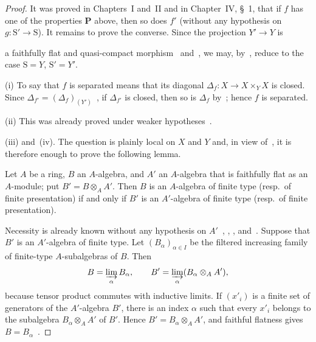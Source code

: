 \begin{proof}
It was proved in Chapters~I and~II and in Chapter~IV, \S~1, that if
$f$ has one of the properties $\mathbf{P}$ above, then so does $f'$
\textnormal{(}without any hypothesis on $g:\mathrm{S}'\to\mathrm{S}$\textnormal{)}.
It remains to prove the converse. Since the projection $Y'\to Y$ is


a faithfully flat and quasi-compact morphism~
and~, we may, by~, reduce to the
case $\mathrm{S}=Y$, $\mathrm{S}'=Y'$.

\textnormal{(i)} To say that $f$ is separated means that its diagonal
$\Delta_f:X\to X\times_Y X$ is closed. Since
$\Delta_{f'}=(\Delta_f)_{(Y')}$~, if
$\Delta_{f'}$ is closed, then so is $\Delta_f$ by~;
hence $f$ is separated.

\textnormal{(ii)} This was already proved under weaker
hypotheses~.

\textnormal{(iii)} and~\textnormal{(iv)}. The question is plainly local
on $X$ and $Y$ and, in view of~, it is therefore enough
to prove the following lemma.

\begin{lemma}[2.7.1.1]
\label{IV.2.7.1.1}
Let $A$ be a ring, $B$ an $A$-algebra, and $A'$ an $A$-algebra that
is faithfully flat as an $A$-module; put $B'=B\otimes_A A'$. Then $B$
is an $A$-algebra of finite type \textnormal{(}resp.\ of finite
presentation\textnormal{)} if and only if $B'$ is an $A'$-algebra of
finite type \textnormal{(}resp.\ of finite presentation\textnormal{)}.
\end{lemma}

Necessity is already known without any hypothesis on
$A'$~, , ,
and~. Suppose that $B'$ is an $A'$-algebra of finite
type. Let $(B_\alpha)_{\alpha\in I}$ be the filtered increasing family
of finite-type $A$-subalgebras of $B$. Then
\[
  B=\varinjlim_\alpha B_\alpha,\qquad
  B'=\varinjlim_\alpha(B_\alpha\otimes_A A'),
\]
because tensor product commutes with inductive limits. If
$(x'_i)$ is a finite set of generators of the $A'$-algebra $B'$, there
is an index $\alpha$ such that every $x'_i$ belongs to the subalgebra
$B_\alpha\otimes_A A'$ of $B'$. Hence
$B'=B_\alpha\otimes_A A'$, and faithful flatness gives
$B=B_\alpha$~.


\end{proof}
